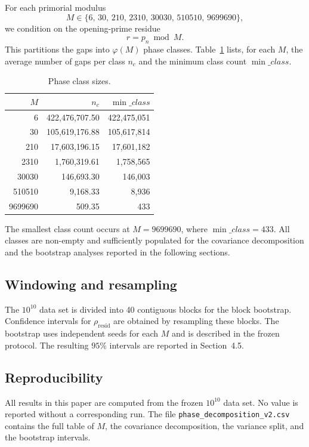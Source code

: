 For each primorial modulus
\[
M \in \{6,\,30,\,210,\,2310,\,30030,\,510510,\,9699690\},
\]
we condition on the opening-prime residue
\[
r = p_n \bmod M.
\]
This partitions the gaps into $\varphi(M)$ phase classes. Table~\ref{tab:class-sizes} lists, for each $M$, the average number of gaps per class $n_c$ and the minimum class count $\min\_class$.

\begin{table}[ht]
\centering
\caption{Phase class sizes.}
\label{tab:class-sizes}
\begin{tabular}{rrr}
\toprule
$M$ & $n_c$ & $\min\_class$ \\
\midrule
6 & 422,476,707.50 & 422,475,051 \\
30 & 105,619,176.88 & 105,617,814 \\
210 & 17,603,196.15 & 17,601,182 \\
2310 & 1,760,319.61 & 1,758,565 \\
30030 & 146,693.30 & 146,003 \\
510510 & 9,168.33 & 8,936 \\
9699690 & 509.35 & 433 \\
\bottomrule
\end{tabular}
\end{table}

The smallest class count occurs at $M=9699690$, where $\min\_class = 433$. All classes are non-empty and sufficiently populated for the covariance decomposition and the bootstrap analyses reported in the following sections.

\subsection{Windowing and resampling}

The $10^{10}$ data set is divided into 40 contiguous blocks for the block bootstrap. Confidence intervals for $\rho_{\text{resid}}$ are obtained by resampling these blocks. The bootstrap uses independent seeds for each $M$ and is described in the frozen protocol. The resulting $95\%$ intervals are reported in Section~4.5.

\subsection{Reproducibility}

All results in this paper are computed from the frozen $10^{10}$ data set. No value is reported without a corresponding run. The file \texttt{phase\_decomposition\_v2.csv} contains the full table of $M$, the covariance decomposition, the variance split, and the bootstrap intervals.
